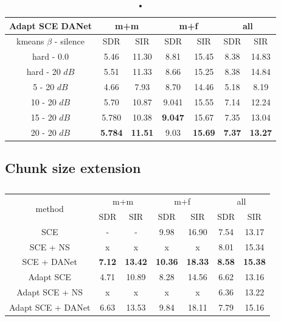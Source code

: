 \documentclass[master, tikz, final,11pt, dvipdfmx]{iscs-thesis}
\begin{document}
\begin{table}[h]
\centering
\begin{tabular}{c|c|c|c|c|c|c}
Adapt SCE DANet & \multicolumn{2}{c|}{m+m} & \multicolumn{2}{c|}{m+f} & \multicolumn{2}{c}{all} \\ 
\hline 
kmeans $\beta$ - silence & SDR & SIR & SDR & SIR & SDR & SIR \\ 
\hline
hard - 0.0  & 5.46 & 11.30 & 8.81 & 15.45 & 8.38 & 14.83 \\ 
hard - 20 $dB$  & 5.51 & 11.33 & 8.66 & 15.25 & 8.38 & 14.84 \\
\hline
\hline
5 - 20 $dB$  & 4.66 & 7.93 & 8.70 & 14.46 & 5.18 & 8.19 \\ 
10 - 20 $dB$  & 5.70 & 10.87 & 9.041 & 15.55 & 7.14 & 12.24 \\ 
15 - 20 $dB$ & 5.780 & 10.38 & \textbf{9.047} & 15.67 & 7.35 & 13.04 \\ 
20 - 20 $dB$ & \textbf{5.784} & \textbf{11.51} & 9.03 & \textbf{15.69} & \textbf{7.37} & \textbf{13.27} \\ 
\end{tabular}
\caption{•}
\label{table:AdaptSCEDANET}
\end{table}

\subsection{Chunk size extension}
\label{ext}

\begin{table}[h]
\centering
\begin{tabular}{c|c|c|c|c|c|c}
\multirow{2}{*}{method} & \multicolumn{2}{c|}{m+m} & \multicolumn{2}{c|}{m+f} & \multicolumn{2}{c}{all} \\ 
\cline{2-7} 
 & SDR & SIR & SDR & SIR & SDR & SIR \\ 
\hline
SCE  & - & - & 9.98 & 16.90 & 7.54 & 13.17 \\
SCE + NS  & x & x & x & x & 8.01 & 15.34 \\
SCE + DANet  & \textbf{7.12} & \textbf{13.42} & \textbf{10.36} & \textbf{18.33} & \textbf{8.58} & \textbf{15.38} \\ 
\hline
\hline
Adapt SCE  & 4.71 & 10.89 & 8.28 & 14.56 & 6.62 & 13.16 \\
Adapt SCE + NS  & x & x & x & x & 6.36 & 13.22 \\
Adapt SCE + DANet  & 6.63 & 13.53 & 9.84 & 18.11 & 7.79 & 15.16 \\ 

\end{tabular}
\captionsetup{justification=centering}
\caption{}
\label{table:SCE400recap}
\end{table}
\end{document}
